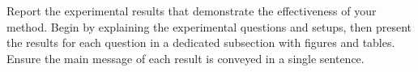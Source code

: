 Report the experimental results that demonstrate the effectiveness of your method. Begin by explaining the experimental questions and setups, then present the results for each question in a dedicated subsection with figures and tables. 
Ensure the main message of each result is conveyed in a single sentence.